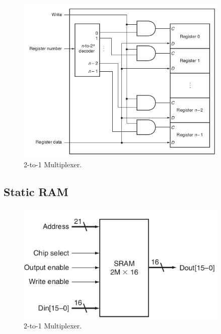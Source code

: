 \documentclass[a4paper, 11pt,oneside]{article}
\begin{document}
\begin{figure}[H]
	\begin{center}
	\includegraphics[width=4in]{rf2.png}
	\caption{2-to-1 Multiplexer.}
	\label{fig:mux} 
	\end{center}
\end{figure}

\subsection{Static RAM}

\begin{figure}[H]
	\begin{center}
	\includegraphics[width=4in]{sram0.png}
	\caption{2-to-1 Multiplexer.}
	\label{fig:mux} 
	\end{center}
\end{figure}
\end{document}
